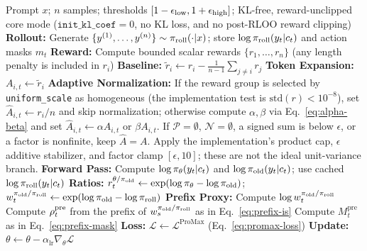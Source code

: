\begin{algorithm}[t]
\caption{REINFORCE Pro Max: minimizing $\mathcal{L}^{\mathrm{ProMax}}$ in Eq.~\eqref{eq:promax-loss}.}
\label{alg:promax}
\begin{algorithmic}[1]
\REQUIRE Prompt $x$; $n$ samples; thresholds $[1-\epsilon_{\mathrm{low}}, 1+\epsilon_{\mathrm{high}}]$; KL-free, reward-unclipped core mode
($\texttt{init\_kl\_coef}=0$, no KL loss, and no post-RLOO reward clipping)
    \STATE \textbf{Rollout:} Generate $\{y^{(1)}, \ldots, y^{(n)}\} \sim \pi_{\mathrm{roll}}(\cdot|x)$; store $\log \pi_{\mathrm{roll}}(y_t|c_t)$ and action masks $m_t$
    \STATE \textbf{Reward:} Compute bounded scalar rewards $\{r_1, \ldots, r_n\}$ (any length penalty is included in $r_i$)
    \STATE \textbf{Baseline:} $\tilde{r}_i \leftarrow r_i - \frac{1}{n-1}\sum_{j \neq i} r_j$ \hfill {}
    \STATE \textbf{Token Expansion:} $A_{i,t} \leftarrow \tilde{r}_i$ \hfill {}
    \STATE \textbf{Adaptive Normalization:} If the reward group is selected by \texttt{uniform\_scale} as homogeneous (the implementation test is $\mathrm{std}(r)<10^{-8}$), set $\hat A_{i,t}\leftarrow r_i/n$ and skip normalization; otherwise compute $\alpha,\beta$ via Eq.~\eqref{eq:alpha-beta}
    \STATE \hspace{2.6em} and set $\hat{A}_{i,t} \leftarrow \alpha A_{i,t}$ or $\beta A_{i,t}$. If $\mathcal{P}=\emptyset$, $\mathcal{N}=\emptyset$, a signed sum is below $\epsilon$, or a factor is nonfinite, keep $\hat A=A$.
    \STATE \hspace{2.6em} Apply the implementation's product cap, $\epsilon$ additive stabilizer, and factor clamp $[\epsilon,10]$; these are not the ideal unit-variance branch.
    \STATE \textbf{Forward Pass:} Compute $\log \pi_{\theta}(y_t|c_t)$ and $\log \pi_{\mathrm{old}}(y_t|c_t)$; use cached $\log \pi_{\mathrm{roll}}(y_t|c_t)$
    \STATE \textbf{Ratios:} $r_t^{\theta/\pi_{\mathrm{old}}} \leftarrow \exp(\log \pi_{\theta}-\log \pi_{\mathrm{old}})$; $w_t^{\pi_{\mathrm{old}}/\pi_{\mathrm{roll}}} \leftarrow \exp(\log \pi_{\mathrm{old}}-\log \pi_{\mathrm{roll}})$
    \STATE \textbf{Prefix Proxy:} Compute $\log w_t^{\pi_{\mathrm{old}}/\pi_{\mathrm{roll}}}$
    \STATE \hspace{2.6em} Compute $\rho_{t}^{\mathrm{pre}}$ from the prefix of $w_s^{\pi_{\mathrm{old}}/\pi_{\mathrm{roll}}}$ as in Eq.~\eqref{eq:prefix-is}
    \STATE \hspace{2.6em} Compute $M_t^{\mathrm{pre}}$ as in Eq.~\eqref{eq:prefix-mask}
    \STATE \textbf{Loss:} $\mathcal{L} \leftarrow \mathcal{L}^{\mathrm{ProMax}}$ (Eq.~\eqref{eq:promax-loss}) \hfill {}
    \STATE \textbf{Update:} $\theta \leftarrow \theta - \alpha_{\mathrm{lr}} \nabla_\theta \mathcal{L}$
\end{algorithmic}
\end{algorithm}

